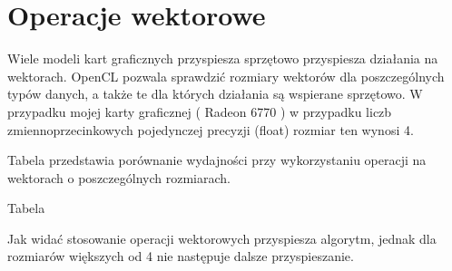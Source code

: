 
\section { Operacje wektorowe }

Wiele modeli kart graficznych przyspiesza sprzętowo przyspiesza działania na wektorach. OpenCL pozwala sprawdzić rozmiary wektorów dla poszczególnych typów danych, a także te dla których działania są wspierane sprzętowo. W przypadku mojej karty graficznej ( Radeon 6770 ) w przypadku liczb zmiennoprzecinkowych pojedynczej precyzji (float) rozmiar ten wynosi 4.

Tabela przedstawia porównanie wydajności przy wykorzystaniu operacji na wektorach o poszczególnych rozmiarach. \linebreak

Tabela \linebreak

Jak widać stosowanie operacji wektorowych przyspiesza algorytm, jednak dla rozmiarów większych od 4 nie następuje dalsze przyspieszanie.